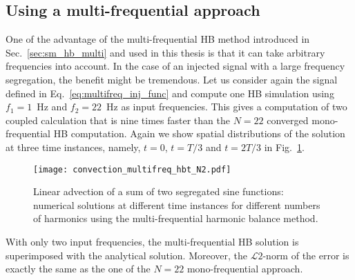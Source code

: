 \subsection{Using a multi-frequential approach}

One of the advantage of the multi-frequential HB method introduced in Sec.~\ref{sec:sm_hb_multi}
and used in this thesis is that it can take arbitrary frequencies into account.
In the case of an injected signal with a large frequency segregation, the
benefit might be tremendous. Let us consider again the signal defined in 
Eq.~\eqref{eq:multifreq_inj_func} and compute one HB simulation using 
$f_1=1$~Hz and $f_2=22$~Hz as input frequencies. This gives a computation
of two coupled calculation
that is nine times faster than the $N=22$ converged mono-frequential
HB computation.
Again
we show spatial distributions of the solution
at three time instances, namely, $t=0$, $t=T/3$ and $t=2T/3$
in Fig.~\ref{fig:inj_multifreq_hb}.
\begin{figure}[htp]
  \centering
  \texttt{[image: convection\_multifreq\_hbt\_N2.pdf]}
  \caption{Linear advection of a sum of two segregated sine functions: 
  numerical solutions at different time instances for different numbers of harmonics using the
  multi-frequential harmonic balance method.}
  \label{fig:inj_multifreq_hb}
\end{figure}
With only two input frequencies, the multi-frequential
HB solution is superimposed with the analytical solution.
Moreover, the $\mathcal{L}2$-norm of the error is 
exactly the same as the one of the $N=22$ mono-frequential
approach.
